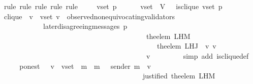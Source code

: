 \begin{isabellebody}
\ {\isacharparenleft}rule{\isacharcomma}\ rule{\isacharcomma}\ rule{\isacharcomma}\ rule{\isacharcomma}\ rule{\isacharparenright}\isanewline
{}\isamarkupfalse%
{\isacharminus}\isanewline
\ \ \isamarkupfalse%
\ {\isasymsigma}\ v{\isacharunderscore}set\ p\ \isamarkupfalse%
\ {\isachardoublequoteopen}{\isasymsigma}\ {\isasymin}\ {\isasymSigma}\ {\isasymand}\ v{\isacharunderscore}set\ {\isasymsubseteq}\ V{\isachardoublequoteclose}\ \ \ {\isachardoublequoteopen}is{\isacharunderscore}clique\ {\isacharparenleft}v{\isacharunderscore}set{\isacharcomma}\ p{\isacharcomma}\ {\isasymsigma}{\isacharparenright}{\isachardoublequoteclose}\ \isanewline
\ \ \isamarkupfalse%
\ \isamarkupfalse%
\ clique{\isacharcolon}\ {\isachardoublequoteopen}{\isasymforall}\ v\ {\isasymin}\ v{\isacharunderscore}set{\isachardot}\ v\ {\isasymin}\ observed{\isacharunderscore}non{\isacharunderscore}equivocating{\isacharunderscore}validators\ {\isasymsigma}\ \ \isanewline
\ \ \ \ \ \ \ \ \ \ \ {\isasymand}\ later{\isacharunderscore}disagreeing{\isacharunderscore}messages\ {\isacharparenleft}p{\isacharcomma}\isanewline
\ \ \ \ \ \ \ \ \ \ \ \ \ \ \ \ \ \ \ \ \ \ \ \ \ \ \ \ \ \ \ \ \ \ \ \ \ \ \ \ \ the{\isacharunderscore}elem\ {\isacharparenleft}L{\isacharunderscore}H{\isacharunderscore}M\ \isanewline
\ \ \ \ \ \ \ \ \ \ \ \ \ \ \ \ \ \ \ \ \ \ \ \ \ \ \ \ \ \ \ \ \ \ \ \ \ \ \ \ \ \ \ \ {\isacharparenleft}the{\isacharunderscore}elem\ {\isacharparenleft}L{\isacharunderscore}H{\isacharunderscore}J\ {\isasymsigma}\ v{\isacharparenright}{\isacharparenright}\ v{\isacharparenright}\isanewline
\ \ \ \ \ \ \ \ \ \ \ \ \ \ \ \ \ \ \ \ \ \ \ \ \ \ \ \ \ \ \ \ \ \ \ \ \ \ \ \ {\isacharcomma}\ v{\isacharcomma}\ {\isasymsigma}{\isacharparenright}\ {\isacharequal}\ {\isasymemptyset}{\isachardoublequoteclose}\isanewline
\ \ \ \ \isamarkupfalse%
\ {\isacharparenleft}simp\ add{\isacharcolon}\ is{\isacharunderscore}clique{\isacharunderscore}def{\isacharparenright}\ \isanewline
\ \ \isamarkupfalse%
\ \isamarkupfalse%
\ p{\isacharunderscore}on{\isacharunderscore}est\ {\isacharcolon}\ {\isachardoublequoteopen}{\isasymforall}\ v\ {\isasymin}\ v{\isacharunderscore}set{\isachardot}\ {\isacharparenleft}{\isasymforall}\ m\ {\isasymin}\ {\isacharbraceleft}m{\isacharprime}\ {\isasymin}\ {\isasymsigma}{\isachardot}\ sender\ m{\isacharprime}\ {\isacharequal}\ v\ \isanewline
\ \ \ \ \ \ \ \ \ \ \ \ \ \ \ \ \ \ \ \ \ \ \ \ \ \ \ \ \ \ \ \ \ \ \ \ \ \ \ {\isasymand}\ justified\ {\isacharparenleft}the{\isacharunderscore}elem\ {\isacharparenleft}L{\isacharunderscore}H{\isacharunderscore}M\ \isanewline

\end{isabellebody}
